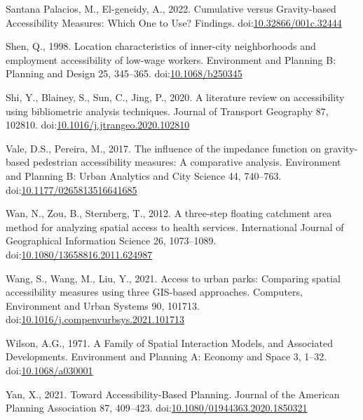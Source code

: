 \documentclass[]{elsarticle} %
\newlength{\cslhangindent}
\newlength{\cslentryspacingunit} %
\newenvironment{CSLReferences}[2] %
 {%
  \setlength{\parindent}{0pt}
  \ifodd #1
  \let\oldpar\par
  \def\par{\hangindent=\cslhangindent\oldpar}
  \fi
  \setlength{\parskip}{#2\cslentryspacingunit}
 }%
 {}
\begin{document}
\begin{CSLReferences}{1}{0}
\leavevmode{}%
Santana Palacios, M., El-geneidy, A., 2022. Cumulative versus
Gravity-based Accessibility Measures: Which One to Use? Findings.
doi:\href{https://doi.org/10.32866/001c.32444}{10.32866/001c.32444}

\leavevmode{}%
Shen, Q., 1998. Location characteristics of inner-city neighborhoods and
employment accessibility of low-wage workers. Environment and Planning
B: Planning and Design 25, 345--365.
doi:\href{https://doi.org/10.1068/b250345}{10.1068/b250345}

\leavevmode{}%
Shi, Y., Blainey, S., Sun, C., Jing, P., 2020. A literature review on
accessibility using bibliometric analysis techniques. Journal of
Transport Geography 87, 102810.
doi:\href{https://doi.org/10.1016/j.jtrangeo.2020.102810}{10.1016/j.jtrangeo.2020.102810}

\leavevmode{}%
Vale, D.S., Pereira, M., 2017. The influence of the impedance function
on gravity-based pedestrian accessibility measures: {A} comparative
analysis. Environment and Planning B: Urban Analytics and City Science
44, 740--763.
doi:\href{https://doi.org/10.1177/0265813516641685}{10.1177/0265813516641685}

\leavevmode{}%
Wan, N., Zou, B., Sternberg, T., 2012. A three-step floating catchment
area method for analyzing spatial access to health services.
International Journal of Geographical Information Science 26,
1073--1089.
doi:\href{https://doi.org/10.1080/13658816.2011.624987}{10.1080/13658816.2011.624987}

\leavevmode{}%
Wang, S., Wang, M., Liu, Y., 2021. Access to urban parks: {Comparing}
spatial accessibility measures using three {GIS}-based approaches.
Computers, Environment and Urban Systems 90, 101713.
doi:\href{https://doi.org/10.1016/j.compenvurbsys.2021.101713}{10.1016/j.compenvurbsys.2021.101713}

\leavevmode{}%
Wilson, A.G., 1971. A Family of Spatial Interaction Models, and
Associated Developments. Environment and Planning A: Economy and Space
3, 1--32. doi:\href{https://doi.org/10.1068/a030001}{10.1068/a030001}

\leavevmode{}%
Yan, X., 2021. Toward Accessibility-Based Planning. Journal of the
American Planning Association 87, 409--423.
doi:\href{https://doi.org/10.1080/01944363.2020.1850321}{10.1080/01944363.2020.1850321}


\end{CSLReferences}
\end{document}
